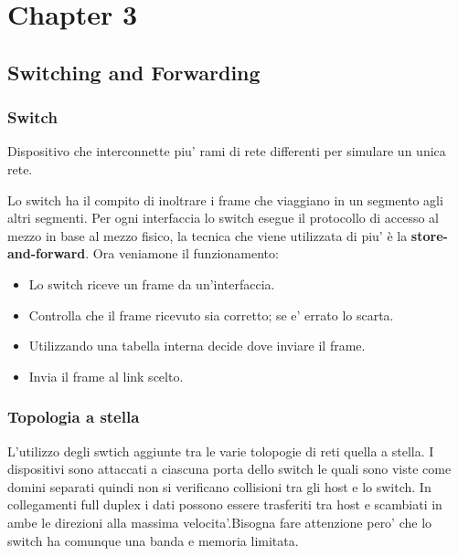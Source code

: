 \chapter{Chapter 3} \label{ch:Chapter3}
\section{Switching and Forwarding}
\subsection{Switch}
\begin{definition}
  Dispositivo che interconnette piu' rami di rete differenti per simulare un unica rete.
\end{definition}
Lo switch ha il compito di inoltrare i frame che viaggiano in un segmento agli altri segmenti. Per ogni interfaccia lo switch esegue il protocollo di accesso al mezzo in base al mezzo fisico, la tecnica che viene utilizzata di piu' è la \textbf{store-and-forward}. Ora veniamone il funzionamento:
\begin{itemize}
  \item Lo switch riceve un frame da un'interfaccia. 
  \item Controlla che il frame ricevuto sia corretto; se e' errato lo scarta.
  \item Utilizzando una tabella interna decide dove inviare il frame.
  \item Invia il frame al link scelto.
\end{itemize}
\subsection{Topologia a stella}
L'utilizzo degli swtich aggiunte tra le varie tolopogie di reti quella a stella. I dispositivi sono attaccati a ciascuna porta dello switch le quali sono viste come domini separati quindi non si verificano collisioni tra gli host e lo switch. In collegamenti full duplex i dati possono essere trasferiti tra host e scambiati in ambe le direzioni alla massima velocita'.Bisogna fare attenzione pero' che lo switch ha comunque una banda e memoria limitata.
